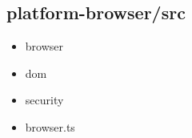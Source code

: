 \subsection{platform-browser/src}


\begin{itemize}
  \item browser
  \item dom
  \item security
\end{itemize}


\begin{itemize}
  \item browser.ts
\end{itemize}






















